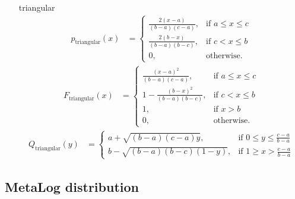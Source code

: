 \begin{itemize}
\item[triangular]
\begin{align}
p_\mathrm{triangular}(x) &= \begin{cases}
                           \frac{2(x-a)}{(b-a)(c-a)}, & \mbox{if } a\leq x \leq c \\
                           \frac{2(b-x)}{(b-a)(b-c)}, & \mbox{if } c <   x \leq b \\
                           0, & \mbox{otherwise}.
                         \end{cases}
\end{align}
\begin{align}
F_\mathrm{triangular}(x) &= \begin{cases}
                           \frac{(x-a)^2}{(b-a)(c-a)}, & \mbox{if } a\leq x \leq c \\
                           1-\frac{(b-x)^2}{(b-a)(b-c)}, & \mbox{if } c <   x \leq b \\
                           1, & \mbox{if } x > b \\
                           0, & \mbox{otherwise}.
                         \end{cases}
\end{align}
\begin{align}
Q_\mathrm{triangular}(y) &= \begin{cases}
                           a+\sqrt{(b-a)(c-a)y}, & \mbox{if } 0\leq y \leq \frac{c-a}{b-a} \\
                           b-\sqrt{(b-a)(b-c)(1-y)}, & \mbox{if } 1 \geq   x > \frac{c-a}{b-a} 
                         \end{cases}
\end{align}
\end{itemize}

\subsection{MetaLog distribution} ~\\

